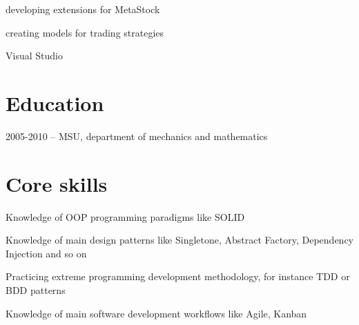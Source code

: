 \documentclass{cv}
\begin{document}
    \begin{gaas}
      \item developing extensions for MetaStock
      \item creating models for trading strategies
    \end{gaas}
    \devtools
      Visual Studio


\section* {Education}
2005-2010 -- MSU, department of mechanics and mathematics


\section* {Core skills}
  \begin{bulist}
    \item Knowledge of OOP programming paradigms like SOLID
    \item Knowledge of main design patterns like Singletone, Abstract Factory,
      Dependency Injection and so on
    \item Practicing extreme programming development methodology, for instance
      TDD or BDD patterns 
    \item Knowledge of main software development workflows like Agile, Kanban
  \end{bulist}

\pagebreak
\end{document}
